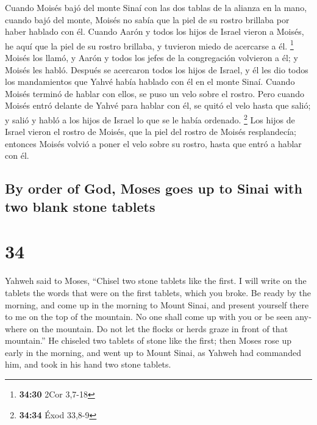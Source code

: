 \begin{paracol}{2}
 Cuando Moisés bajó del monte Sinaí con las dos tablas de
la alianza en la mano, cuando bajó del monte, Moisés no sabía que la
piel de su rostro brillaba por haber hablado con él. 
Cuando Aarón y todos los hijos de Israel vieron a Moisés, he aquí que la
piel de su rostro brillaba, y tuvieron miedo de acercarse a él.
\footnote{\textbf{34:30} 2Cor 3,7-18}  Moisés los llamó,
y Aarón y todos los jefes de la congregación volvieron a él; y Moisés
les habló.  Después se acercaron todos los hijos de
Israel, y él les dio todos los mandamientos que Yahvé había hablado con
él en el monte Sinaí.  Cuando Moisés terminó de hablar
con ellos, se puso un velo sobre el rostro.  Pero cuando
Moisés entró delante de Yahvé para hablar con él, se quitó el velo hasta
que salió; y salió y habló a los hijos de Israel lo que se le había
ordenado. \footnote{\textbf{34:34} Éxod 33,8-9}  Los
hijos de Israel vieron el rostro de Moisés, que la piel del rostro de
Moisés resplandecía; entonces Moisés volvió a poner el velo sobre su
rostro, hasta que entró a hablar con él.

\switchcolumn
\begin{otherlanguage}{english}

\hypertarget{by-order-of-god-moses-goes-up-to-sinai-with-two-blank-stone-tablets}{%
\subsection{By order of God, Moses goes up to Sinai with two blank stone
tablets}\label{by-order-of-god-moses-goes-up-to-sinai-with-two-blank-stone-tablets}}

\hypertarget{section-67}{%
\section{34}\label{section-67}}

 Yahweh said to Moses, ``Chisel two stone tablets like the
first. I will write on the tablets the words that were on the first
tablets, which you broke.  Be ready by the morning, and
come up in the morning to Mount Sinai, and present yourself there to me
on the top of the mountain.  No one shall come up with you
or be seen anywhere on the mountain. Do not let the flocks or herds
graze in front of that mountain.''  He chiseled two
tablets of stone like the first; then Moses rose up early in the
morning, and went up to Mount Sinai, as Yahweh had commanded him, and
took in his hand two stone tablets.


\end{otherlanguage}
\end{paracol}
